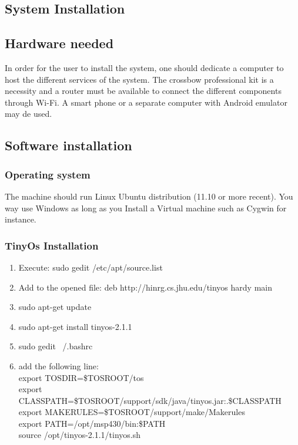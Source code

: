 \documentclass[oneside,12pt,a4paper,final]{book}
\begin{document}
\renewcommand{\bibname}{Index}
 



\begin{appendices}
\chapter{System Installation}
\section{Hardware needed}
In order for the user to install the system, one should dedicate a computer to host the different services of the system. The crossbow professional kit is a necessity and a router must be available to connect the different components through Wi-Fi. A smart phone or a separate computer with Android emulator may de used.

\section{Software installation}

\subsection{Operating system}
The machine should run Linux Ubuntu distribution (11.10 or more recent). You way use Windows as long as you Install a Virtual machine such as Cygwin for instance.
\subsection{TinyOs Installation}
\begin{enumerate}
\item Execute: sudo gedit /etc/apt/source.list
\item Add to the opened file: deb http://hinrg.cs.jhu.edu/tinyos hardy main
\item sudo apt-get update 
\item sudo apt-get install tinyos-2.1.1
\item sudo gedit ~/.bashrc
\item add the following line: \\
export TOSDIR=\$TOSROOT/tos \\
export CLASSPATH=\$TOSROOT/support/sdk/java/tinyos.jar:.\$CLASSPATH \\
export MAKERULES=\$TOSROOT/support/make/Makerules \\
export PATH=/opt/msp430/bin:\$PATH \\
source /opt/tinyos-2.1.1/tinyos.sh \\


\end{enumerate}
\end{appendices}
\end{document}

